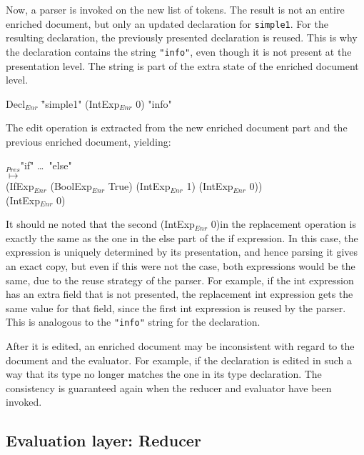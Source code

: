 Now, a parser is invoked on the new list of tokens. The result is not an entire enriched document, but only an updated declaration for \verb|simple1|. For the resulting declaration, the previously presented declaration is reused. This is why the declaration contains the string \verb|"info"|, even though it is not present at the presentation level. The string is part of the extra state of the enriched document level.

\small \ttfamily
\begin{tabbing}
Decl$_{Enr}$ \= "simple1" (IntExp$_{Enr}$ 0) "info"
\end{tabbing}
\rmfamily \normalsize

The edit operation is extracted from the new enriched document part and the previous enriched document, yielding:

\small \ttfamily
\begin{tabbing}
$_{Pres}$\ttfamily  "if" \dots~"else"\\
$\mapsto$\\
  \ttfamily (IfExp$_{Enr}$ (BoolExp$_{Enr}$ True) (IntExp$_{Enr}$ 1) (IntExp$_{Enr}$ 0))\\
  \ttfamily (IntExp$_{Enr}$ 0) 
\end{tabbing}
\rmfamily \normalsize

It should ne noted that the second \ttfamily (IntExp$_{Enr}$ 0)\rmfamily in the replacement operation is exactly the same as the one in the else part of the if expression. In this case, the expression is uniquely determined by its presentation, and hence parsing it gives an exact copy, but even if this were not the case, both expressions would be the same, due to the reuse strategy of the parser. For example, if the int expression has an extra field that is not presented, the replacement int expression gets the same value for that field, since the first int expression is reused by the parser. This is analogous to the \verb|"info"| string for the declaration.

After it is edited, an enriched document may be inconsistent with regard to the document and the evaluator. For example, if the declaration is edited in such a way that its type no longer matches the one in its type declaration. The consistency is guaranteed again when the reducer and evaluator have been invoked.


%																
\subsection{Evaluation layer: Reducer} \label{sect:reducer}

